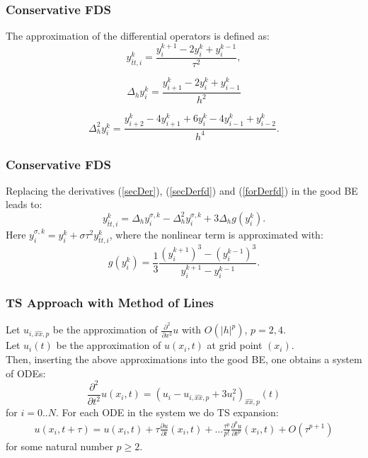 \documentclass{beamer}
\newcommand{\be}{\begin{equation}}
\newcommand{\ee}{\end{equation}}
\newcommand{\rf}[1]{(\ref{#1})}
\begin{document}

\begin{frame}
\frametitle{Conservative FDS}
The approximation of the differential operators is defined as:
\begin{equation}\label{secDer}
y_{\bar{t}t,i}^k=\dfrac{y_i^{k+1}-2y_i^k+y_i^{k-1}}{\tau^2},
\end{equation}

\begin{equation}\label{secDerfd}
\Delta_h y_i^k=\dfrac{y_{i+1}^k-2y_i^k+y_{i-1}^k}{h^2}
\end{equation}

\begin{equation}\label{forDerfd}
\Delta_h^2 y_i^k=\dfrac{y_{i+2}^k-4y_{i+1}^k+6y_{i}^k-4y_{i-1}^k+y_{i-2}^k}{h^4}.
\end{equation}

\end{frame}


\begin{frame}
\frametitle{Conservative FDS}
Replacing the derivatives \rf{secDer}, \rf{secDerfd} and \rf{forDerfd} in the good BE leads to:
\begin{equation}\label{scheme1}
y_{\bar{t}t,i}^k=\Delta_h y_i^{\sigma,k}-\Delta_h^2 y_i^{\sigma,k} +3\Delta_h g(y_i^k).
\end{equation}
Here $ y_i^{\sigma,k}= y_i^{k}+\sigma \tau^2 y_{\bar{t}t,i}^k$, where the nonlinear term is approximated with:
\begin{equation}\label{nonLin}
g(y_i^k) = \frac{1}{3} \frac{(y_i^{k+1})^3 - (y_i^{k-1})^3}{y_i^{k+1} - y_i^{k-1}}.
\end{equation}


\end{frame}



\begin{frame}
\frametitle{TS Approach with Method of Lines}

Let $u_{i, \widehat{xx}, p}$ be the approximation of $\frac{\partial^2 }{\partial x^2} u$ with $O(|h|^p)$, $p=2,4$.
\\
Let $u_{i}(t)$ be the approximation of $u(x_i, t)$ at grid point $(x_i)$.
\\
Then, inserting the above approximations into the good BE, one obtains a system of ODEs:
\be \label{DiscreteEq}
\frac{\partial^2 }{\partial t^2}u(x_i, t)  =
(u_{i} - u_{i, \widehat{xx}, p} + 3u^2_{i})_{\widehat{xx}, p}(t)
\ee
for $i = 0..N$. For each ODE in the system we do TS expansion:
\begin{align} \label{TSe}
u(x_i, t+\tau) = u(x_i, t) + \tau \frac{ \partial u }{ \partial t }(x_i, t)  + ... 
\frac{ \tau^p }{ p! } \frac{ \partial^p u }{ \partial t^p }(x_i, t) + O(\tau^{p+1})
\end{align}
for some natural number $p \ge 2$.
\end{frame}
\end{document}
